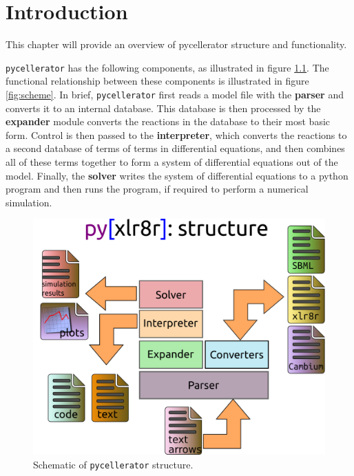 \chapter{Introduction}

This chapter will provide an overview of pycellerator structure and functionality. 

{\tt pycellerator} has the following components, as illustrated in figure \ref{fig:structure}. The functional relationship between these components is illustrated in figure \ref{fig:scheme}. In brief, {\tt pycellerator} first reads a model file with the \textbf{parser} and converts it to an internal database. This database is then processed by the \textbf{expander} module converts the reactions in the database to their most basic form. Control is then passed to the \textbf{interpreter}, which converts the reactions to a second database of terms of terms in differential equations, and then combines all of these terms together to form a system of differential equations out of the model. Finally, the \textbf{solver} writes the system of differential equations to a python program and then runs the program, if required to perform a numerical simulation. 

\begin{figure}[ht]
\caption{Schematic of {\tt pycellerator} structure.}\label{fig:structure}
\begin{center}
\includegraphics[width=.75\textwidth]{pyxlr8r-struct}
\end{center}
\end{figure}


